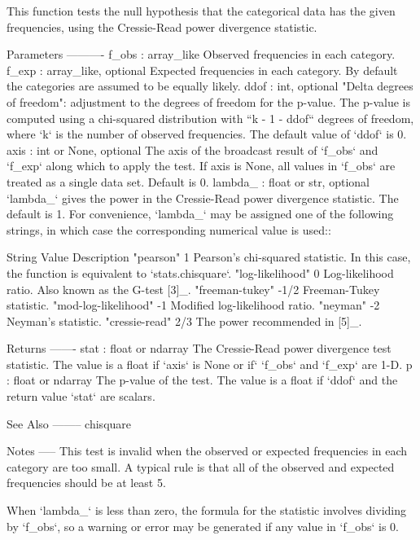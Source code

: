 \begin{DoxyVerb}
\begin{DoxyVerb}
This function tests the null hypothesis that the categorical data
has the given frequencies, using the Cressie-Read power divergence
statistic.

Parameters
----------
f_obs : array_like
    Observed frequencies in each category.
f_exp : array_like, optional
    Expected frequencies in each category.  By default the categories are
    assumed to be equally likely.
ddof : int, optional
    "Delta degrees of freedom": adjustment to the degrees of freedom
    for the p-value.  The p-value is computed using a chi-squared
    distribution with ``k - 1 - ddof`` degrees of freedom, where `k`
    is the number of observed frequencies.  The default value of `ddof`
    is 0.
axis : int or None, optional
    The axis of the broadcast result of `f_obs` and `f_exp` along which to
    apply the test.  If axis is None, all values in `f_obs` are treated
    as a single data set.  Default is 0.
lambda_ : float or str, optional
    `lambda_` gives the power in the Cressie-Read power divergence
    statistic.  The default is 1.  For convenience, `lambda_` may be
    assigned one of the following strings, in which case the
    corresponding numerical value is used::

        String              Value   Description
        "pearson"             1     Pearson's chi-squared statistic.
                                    In this case, the function is
                                    equivalent to `stats.chisquare`.
        "log-likelihood"      0     Log-likelihood ratio. Also known as
                                    the G-test [3]_.
        "freeman-tukey"      -1/2   Freeman-Tukey statistic.
        "mod-log-likelihood" -1     Modified log-likelihood ratio.
        "neyman"             -2     Neyman's statistic.
        "cressie-read"        2/3   The power recommended in [5]_.

Returns
-------
stat : float or ndarray
    The Cressie-Read power divergence test statistic.  The value is
    a float if `axis` is None or if` `f_obs` and `f_exp` are 1-D.
p : float or ndarray
    The p-value of the test.  The value is a float if `ddof` and the
    return value `stat` are scalars.

See Also
--------
chisquare

Notes
-----
This test is invalid when the observed or expected frequencies in each
category are too small.  A typical rule is that all of the observed
and expected frequencies should be at least 5.

When `lambda_` is less than zero, the formula for the statistic involves
dividing by `f_obs`, so a warning or error may be generated if any value
in `f_obs` is 0.


\end{DoxyVerb}
\end{DoxyVerb}
